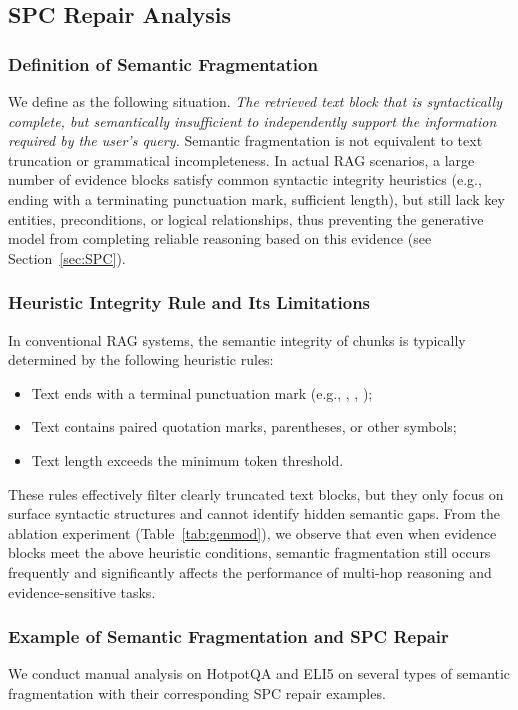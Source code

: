 \subsection{SPC Repair Analysis}

\subsubsection{Definition of Semantic Fragmentation}
We define  as the following situation. 
\textit{The retrieved text block that is syntactically complete, but semantically insufficient to independently support the information required by the user's query.} 
Semantic fragmentation is not equivalent to text truncation or grammatical incompleteness.
In actual RAG scenarios, a large number of evidence blocks satisfy common syntactic integrity heuristics (e.g., ending with a terminating punctuation mark, sufficient length), but still lack key entities, preconditions, or logical relationships, thus preventing the generative model from completing reliable reasoning based on this evidence (see Section~\ref{sec:SPC}).


\subsubsection{Heuristic Integrity Rule and Its Limitations}
In conventional RAG systems, the semantic integrity of chunks is typically determined by the following  heuristic rules:
\begin{itemize}
    \item Text ends with a terminal punctuation mark (e.g., , , \say{!});
    \item Text contains paired quotation marks, parentheses, or other symbols;
    \item Text length exceeds the minimum token threshold.
\end{itemize}
These rules effectively filter clearly truncated text blocks, but they only focus on surface syntactic structures and cannot identify hidden semantic gaps. 
From the ablation experiment (Table~\ref{tab:genmod}), we observe that even when evidence blocks meet the above heuristic conditions, semantic fragmentation still occurs frequently and significantly affects the performance of multi-hop reasoning and evidence-sensitive tasks. 



\subsubsection{Example of Semantic Fragmentation and SPC Repair}
We conduct manual analysis on HotpotQA and ELI5 on several types of semantic fragmentation with their corresponding SPC repair examples.

